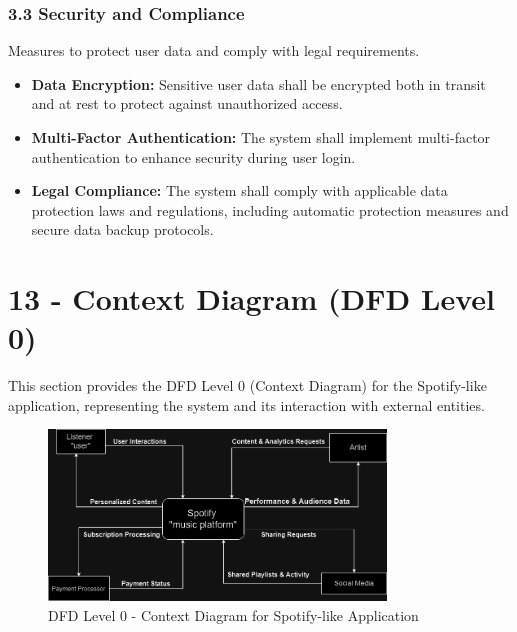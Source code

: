 \documentclass[a4paper,10pt]{article}
\begin{document}
\subsubsection*{3.3 Security and Compliance}
Measures to protect user data and comply with legal requirements.

\begin{itemize}[leftmargin=*]
    \item \textbf{Data Encryption:} Sensitive user data shall be encrypted both in transit and at rest to protect against unauthorized access.
    \item \textbf{Multi-Factor Authentication:} The system shall implement multi-factor authentication to enhance security during user login.
    \item \textbf{Legal Compliance:} The system shall comply with applicable data protection laws and regulations, including automatic protection measures and secure data backup protocols.
\end{itemize}
\newpage
\section*{13 - Context Diagram (DFD Level 0)}
This section provides the DFD Level 0 (Context Diagram) for the Spotify-like application, representing the system and its interaction with external entities.

\begin{figure}[h!]
    \centering
    \includegraphics[width=0.8\textwidth]{DFD@Dark.drawio.png}
    \caption{DFD Level 0 - Context Diagram for Spotify-like Application}
    \label{fig:dfd-level0}
\end{figure}
\end{document}
